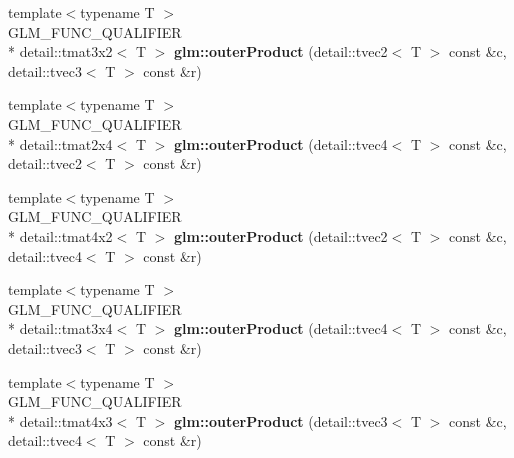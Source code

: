 \begin{DoxyCompactItemize}
\item 
\hypertarget{namespaceglm_af3835ed91b031947048595312d2bc387}{{\footnotesize template$<$typename T $>$ }\\G\-L\-M\-\_\-\-F\-U\-N\-C\-\_\-\-Q\-U\-A\-L\-I\-F\-I\-E\-R \\*
detail\-::tmat3x2$<$ T $>$ {\bfseries glm\-::outer\-Product} (detail\-::tvec2$<$ T $>$ const \&c, detail\-::tvec3$<$ T $>$ const \&r)}\label{namespaceglm_af3835ed91b031947048595312d2bc387}

\item 
\hypertarget{namespaceglm_a7c2cdc0bd949ec6907e8c28e22059f01}{{\footnotesize template$<$typename T $>$ }\\G\-L\-M\-\_\-\-F\-U\-N\-C\-\_\-\-Q\-U\-A\-L\-I\-F\-I\-E\-R \\*
detail\-::tmat2x4$<$ T $>$ {\bfseries glm\-::outer\-Product} (detail\-::tvec4$<$ T $>$ const \&c, detail\-::tvec2$<$ T $>$ const \&r)}\label{namespaceglm_a7c2cdc0bd949ec6907e8c28e22059f01}

\item 
\hypertarget{namespaceglm_a45ad2846226667a7912f3675eadb71f5}{{\footnotesize template$<$typename T $>$ }\\G\-L\-M\-\_\-\-F\-U\-N\-C\-\_\-\-Q\-U\-A\-L\-I\-F\-I\-E\-R \\*
detail\-::tmat4x2$<$ T $>$ {\bfseries glm\-::outer\-Product} (detail\-::tvec2$<$ T $>$ const \&c, detail\-::tvec4$<$ T $>$ const \&r)}\label{namespaceglm_a45ad2846226667a7912f3675eadb71f5}

\item 
\hypertarget{namespaceglm_a89c4470ff5ee964466f48d7a2810de30}{{\footnotesize template$<$typename T $>$ }\\G\-L\-M\-\_\-\-F\-U\-N\-C\-\_\-\-Q\-U\-A\-L\-I\-F\-I\-E\-R \\*
detail\-::tmat3x4$<$ T $>$ {\bfseries glm\-::outer\-Product} (detail\-::tvec4$<$ T $>$ const \&c, detail\-::tvec3$<$ T $>$ const \&r)}\label{namespaceglm_a89c4470ff5ee964466f48d7a2810de30}

\item 
\hypertarget{namespaceglm_ae113cac3852e7e6087aa1a275d8d88b8}{{\footnotesize template$<$typename T $>$ }\\G\-L\-M\-\_\-\-F\-U\-N\-C\-\_\-\-Q\-U\-A\-L\-I\-F\-I\-E\-R \\*
detail\-::tmat4x3$<$ T $>$ {\bfseries glm\-::outer\-Product} (detail\-::tvec3$<$ T $>$ const \&c, detail\-::tvec4$<$ T $>$ const \&r)}\label{namespaceglm_ae113cac3852e7e6087aa1a275d8d88b8}


\end{DoxyCompactItemize}
